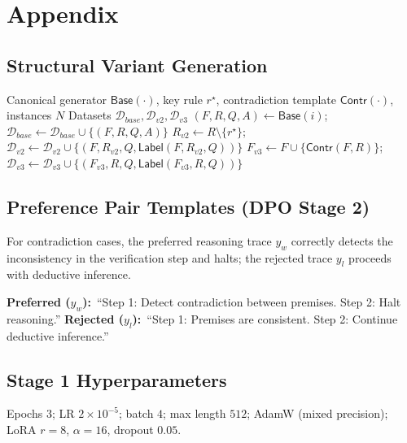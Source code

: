 \documentclass{article} %
\begin{document}



\appendix
\section{Appendix}

\subsection{Structural Variant Generation}
\label{app:variant-gen}

\begin{algorithm}[h]
\caption{Structural Variant Generation (Variant 2 \& 3)}
\label{alg:variant23}
\small
\begin{algorithmic}[1]
\Require Canonical generator $\mathsf{Base}(\cdot)$, key rule $r^\star$, contradiction template $\mathsf{Contr}(\cdot)$, instances $N$
\Ensure Datasets $\mathcal{D}_{base}, \mathcal{D}_{v2}, \mathcal{D}_{v3}$
    \State $(F,R,Q,A) \gets \mathsf{Base}(i)$;\quad $\mathcal{D}_{base} \gets \mathcal{D}_{base} \cup \{(F,R,Q,A)\}$
    \State $R_{v2} \gets R \setminus \{r^\star\}$;\quad $\mathcal{D}_{v2} \gets \mathcal{D}_{v2} \cup \{(F,R_{v2},Q,\mathsf{Label}(F,R_{v2},Q))\}$
    \State $F_{v3} \gets F \cup \{\mathsf{Contr}(F,R)\}$;\quad $\mathcal{D}_{v3} \gets \mathcal{D}_{v3} \cup \{(F_{v3},R,Q,\mathsf{Label}(F_{v3},R,Q))\}$
\EndFor
\end{algorithmic}
\end{algorithm}

\subsection{Preference Pair Templates (DPO Stage 2)}
\label{app:pref-pairs}
For contradiction cases, the preferred reasoning trace $y_w$ correctly detects the inconsistency in the verification step and halts; the rejected trace $y_l$ proceeds with deductive inference.

\textbf{Preferred ($y_w$):}~``Step 1: Detect contradiction between premises. Step 2: Halt reasoning.''\quad
\textbf{Rejected ($y_l$):}~``Step 1: Premises are consistent. Step 2: Continue deductive inference.''

\subsection{Stage 1 Hyperparameters}
\label{app:hyper}
Epochs $3$; LR $2{\times}10^{-5}$; batch $4$; max length $512$; AdamW (mixed precision); LoRA $r{=}8$, $\alpha{=}16$, dropout $0.05$.
\end{document}

